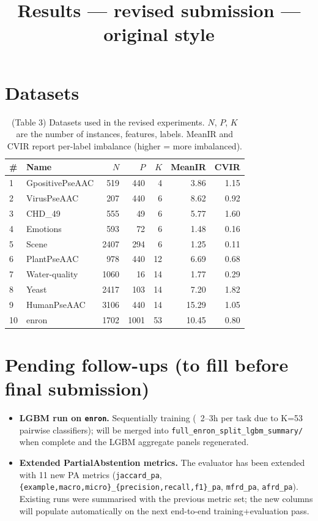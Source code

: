 \documentclass[11pt]{article}
\title{Results --- revised submission --- original style}
\author{}
\date{}
\begin{document}
\maketitle

\section{Datasets}

\begin{table}[!htbp]
\centering
\begin{tabular}{l|l|r|r|r|r|r}
\hline
\# & Name & $N$ & $P$ & $K$ & MeanIR & CVIR \\
\hline
1  & GpositivePseAAC & 519  & 440  & 4  & 3.86  & 1.15 \\
2  & VirusPseAAC     & 207  & 440  & 6  & 8.62  & 0.92 \\
3  & CHD\_49         & 555  & 49   & 6  & 5.77  & 1.60 \\
4  & Emotions        & 593  & 72   & 6  & 1.48  & 0.16 \\
5  & Scene           & 2407 & 294  & 6  & 1.25  & 0.11 \\
6  & PlantPseAAC     & 978  & 440  & 12 & 6.69  & 0.68 \\
7  & Water-quality   & 1060 & 16   & 14 & 1.77  & 0.29 \\
8  & Yeast           & 2417 & 103  & 14 & 7.20  & 1.82 \\
9  & HumanPseAAC     & 3106 & 440  & 14 & 15.29 & 1.05 \\
10 & enron           & 1702 & 1001 & 53 & 10.45 & 0.80 \\
\hline
\end{tabular}
\caption{(Table 3) Datasets used in the revised experiments. $N$, $P$, $K$ are the number of instances, features, labels. MeanIR and CVIR report per-label imbalance (higher = more imbalanced).}
\label{tab:datasets_revised}
\end{table}

\section*{Pending follow-ups (to fill before final submission)}
\begin{itemize}
  \item \textbf{LGBM run on \texttt{enron}.} Sequentially training (~2--3h
        per task due to K=53 pairwise classifiers); will be merged into
        \texttt{full\_enron\_split\_lgbm\_summary/} when complete and the
        LGBM aggregate panels regenerated.
  \item \textbf{Extended PartialAbstention metrics.} The evaluator has been
        extended with 11 new PA metrics
        (\texttt{jaccard\_pa}, \texttt{\{example,macro,micro\}\_\{precision,recall,f1\}\_pa},
        \texttt{mfrd\_pa}, \texttt{afrd\_pa}). Existing runs were summarised
        with the previous metric set; the new columns will populate
        automatically on the next end-to-end training+evaluation pass.
\end{itemize}
\end{document}
